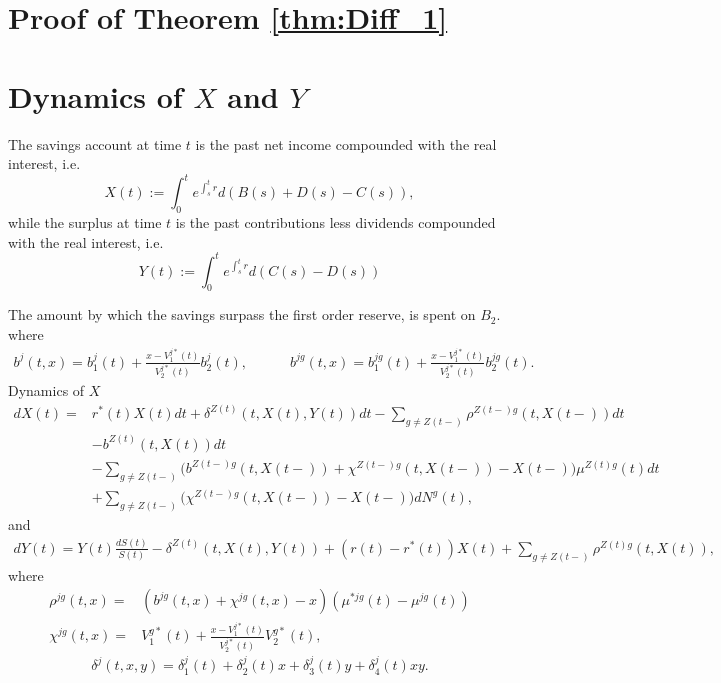 \documentclass[12pt]{article}
\theoremstyle{my_thm}
\begin{document}
\appendix

\section{Proof of Theorem \ref{thm:Diff_1} }
\section{Dynamics of $X$ and $Y$}\label{seq:Dyn}
The savings account at time $t$ is the past net income compounded with the real interest, i.e.
$$
X(t):=\int_0^t e^{\int_s^t r} d(B(s)+D(s)-C(s)),
$$
while the surplus at time $t$ is the past contributions less dividends compounded with the real interest, i.e.
$$
Y(t):=\int_0^t e^{\int_s^t r} d(C(s)-D(s))
$$


The amount by which the savings surpass the first order reserve, is spent on $B_2$. 
where
\begin{gather*}
b^j(t,x)=b_1^j(t)+\frac{x-V_1^{j*}(t)}{V_2^{j*}(t)}b^j_2(t),
\qquad \quad
b^{jg}(t,x)=b_1^{jg}(t)+\frac{x-V_1^{j*}(t)}{V_2^{j*}(t)}b^{jg}_2(t).
\end{gather*}
Dynamics of $X$
\begin{align*}
dX(t)=&
r^*(t)X(t)dt
 +\delta^{Z(t)}(t,X(t),Y(t))  dt- \sum_{g \neq Z(t-)} \rho^{Z(t-)g}(t,X(t-)) dt
 \nonumber 
\\
\nonumber
&- b^{Z(t)}(t,X(t)) dt
\\
&- \sum_{g\neq Z(t-)}\bigg(b^{Z(t-)g}(t,X(t-))+\chi^{Z(t-)g}(t,X(t-))-X(t-) \bigg) \mu^{Z(t)g}(t)dt
\\
&+ \sum_{g\neq Z(t-)}\bigg(\chi^{Z(t-)g}(t,X(t-))-X(t-) \bigg)  dN^g(t),
\end{align*}
and
\begin{align*}
dY(t)=Y(t)\frac{dS(t)}{S(t)}-\delta^{Z(t)}(t,X(t),Y(t)) + (r(t)-r^*(t)) X(t) + \sum_{g \neq Z(t-)} \rho^{Z(t)g}(t,X(t)),
\end{align*}
where
\begin{align*}
\rho^{jg}(t,x)=&(b^{jg}(t,x)+ \chi^{jg}(t,x)-x) (\mu^{*jg}(t)-\mu^{jg}(t))
\\
\chi^{jg}(t,x)=& V^{g*}_1(t) + \frac{x-V^{j*}_1(t)}{V^{j*}_2(t)}V^{g*}_2(t),
\end{align*}
\begin{equation}
\delta^j(t,x,y)=\delta_1^j(t)+\delta_2^j(t)x+\delta_3^j(t)y+\delta_4^j(t)xy.
\end{equation}
\end{document}

